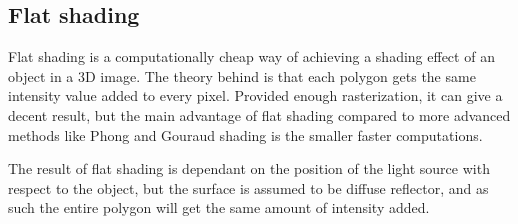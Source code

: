 \subsection{Flat shading}

Flat shading is a computationally cheap way of achieving a shading effect of an
object in a 3D image. The theory behind is that each polygon gets the same
intensity value added to every pixel. Provided enough rasterization, it can
give a decent result, but the main advantage of flat shading compared to more
advanced methods like Phong and Gouraud shading is the smaller faster computations. 

The result of flat shading is dependant on the position of the light source with respect to the object, but the surface is assumed to be diffuse reflector, and as such the entire polygon will get the same amount of intensity added. 
